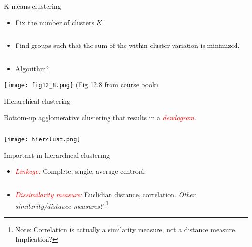 \documentclass[
  10pt,
  ignorenonframetext,
]{beamer}
\providecommand{\tightlist}{%
  \setlength{\itemsep}{0pt}\setlength{\parskip}{0pt}}
\begin{document}
\begin{frame}
\begin{block}{K-means clustering}
\protect\hypertarget{k-means-clustering}{}
\(~\)

\begin{itemize}
\tightlist
\item
  Fix the number of clusters \(K\).
\end{itemize}

\(~\)

\begin{itemize}
\tightlist
\item
  Find groups such that the sum of the within-cluster variation is
  minimized.
\end{itemize}

\(~\)

\begin{itemize}
\tightlist
\item
  Algorithm?
\end{itemize}
\end{block}
\end{frame}

\begin{frame}
\centering

\texttt{[image: fig12\_8.png]}
\flushleft \small (Fig 12.8 from course book)
\end{frame}

\begin{frame}
\begin{block}{Hierarchical clustering}
\protect\hypertarget{hierarchical-clustering}{}
\(~\)

Bottom-up agglomerative clustering that results in a
\emph{\textcolor{red}{dendogram}}.

\(~\)

\texttt{[image: hierclust.png]}
\end{block}
\end{frame}

\begin{frame}
\begin{block}{Important in hierarchical clustering}
\protect\hypertarget{important-in-hierarchical-clustering}{}
\(~\)

\begin{itemize}
\tightlist
\item
  \emph{\textcolor{red}{Linkage:}} Complete, single, average centroid.
\end{itemize}

\(~\)

\begin{itemize}
\tightlist
\item
  \emph{\textcolor{red}{Dissimilarity measure:}} Euclidian distance,
  correlation. \emph{Other similarity/distance measures?}
  \footnote{ Note: Correlation is actually a similarity measure, not a distance measure. Implication?}
\end{itemize}
\end{block}
\end{frame}
\end{document}
